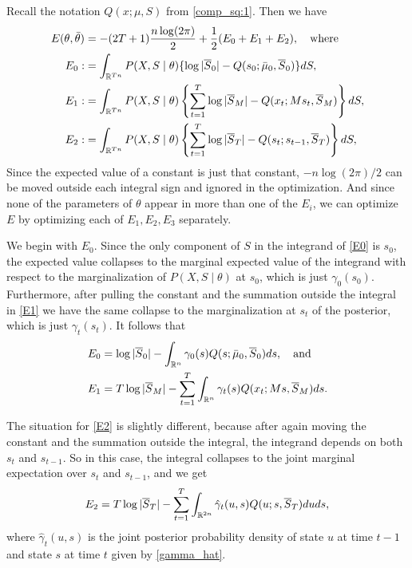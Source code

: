 \documentclass[12pt,leqno]{article}
\begin{document}
  
Recall the notation $Q(x;\mu,S)$ from \eqref{comp_sq:1}.  Then we have
\begin{align}
  E(\theta,\bar{\theta}) &= -(2T+1)\frac{n\log(2\pi)}{2} + \frac{1}{2}(E_0 + E_1 + E_2),\quad\text{where}\notag\\
  E_0 :&=\int_{{\mathbb R}^{Tn}}P(X,S\mid\theta)\{\log|\overline{S}_0| - Q(s_0;\bar{\mu}_0,\overline{S}_0)\}dS,\label{E0}\\
  E_1 :&= \int_{{\mathbb R}^{Tn}}P(X,S\mid\theta)\left\{\sum_{t=1}^T\log|\overline{S}_M| - Q(x_t;Ms_t,\overline{S}_M)\right\}dS,
\label{E1}\\
  E_2 :&= \int_{{\mathbb R}^{Tn}}P(X,S\mid\theta)\left\{\sum_{t=1}^T\log|\overline{S}_T| - Q(s_t;s_{t-1},\overline{S}_T)\right\}dS,
\label{E2}
\end{align}
Since the expected value of a constant is just that constant, $-n\log(2\pi)/2$ can be moved outside each
integral sign and ignored in the optimization.  And since none of the parameters of $\theta$ appear in more
than one of the $E_i$, we can optimize $E$ by optimizing each of $E_1,E_2,E_3$ separately.

We begin with $E_0$. Since the only component of $S$ in the integrand of \eqref{E0} is $s_0$, the expected value
collapses to the marginal 
expected value of the integrand with respect to the marginalization of $P(X,S\mid\theta)$ at $s_0$, which is just 
$\gamma_0(s_0)$.  Furthermore, after pulling the constant and the summation 
outside the integral in \eqref{E1} we have the same collapse to the marginalization at $s_t$ of the posterior, which
is just $\gamma_t(s_t)$.  It follows that
\begin{align*}
E_0 &= \log|\overline{S}_0| - \int_{{\mathbb R}^n}\gamma_0(s)Q(s;\bar{\mu}_0,\overline{S}_0)ds,\quad\text{and}\\
E_1 &= T\log|\overline{S}_M| - \sum_{t=1}^T\int_{{\mathbb R}^n}\gamma_t(s)Q(x_t;Ms,\overline{S}_M)ds.
\end{align*}

The situation for \eqref{E2} is slightly different, because after again moving the constant and the summation outside
the integral, the integrand depends on both $s_t$ and $s_{t-1}$.  So in this case, the integral collapses to the 
joint marginal expectation over $s_t$ and $s_{t-1}$, and we get
$$
E_2 = T\log|\overline{S}_T| - \sum_{t=1}^T\int_{{\mathbb R}^{2n}}\hat{\gamma}_t(u,s)Q(u;s,\overline{S}_T)duds,
$$
where $\hat{\gamma}_t(u,s)$ is the joint posterior probability density of state $u$ at time $t-1$ and state $s$ 
at time $t$ given by \eqref{gamma_hat}.
\end{document}
